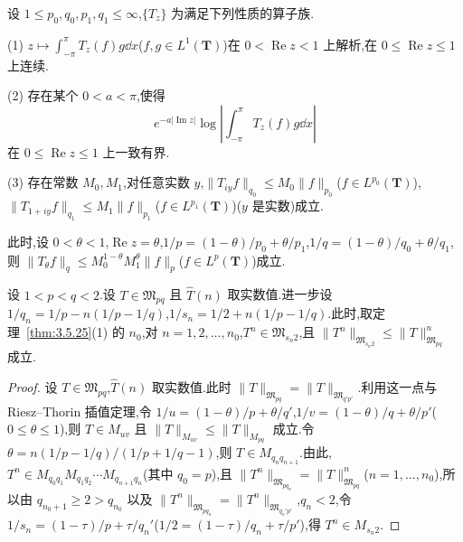 \begin{lemma}[Stein]\label{lem:3.5.28}
设 $1 \leq p_{0}, q_{0}, p_{1}, q_{1} \leq \infty$,$\{T_{z}\}$ 为满足下列性质的算子族.

(1) $z \mapsto \int_{-\pi}^{\pi}T_z(f)g\dd x$($f, g \in L^1(\mathbf{T})$)在 $0 < \operatorname{Re} z < 1$ 上解析,在 $0 \leq \operatorname{Re} z \leq 1$ 上连续.

(2) 存在某个 $0 < a < \pi$,使得
\begin{equation*}
e^{-a|\operatorname{Im}z|}\log\left|\int_{-\pi}^{\pi}T_{z}(f)g\dd x\right|
\end{equation*}
在 $0 \leq \operatorname{Re}z \leq 1$ 上一致有界.

(3) 存在常数 $M_0, M_1$,对任意实数 $y$,$\|T_{iy}f\|_{q_0} \leq M_0\|f\|_{p_0}$($f \in L^{p_0}(\mathbf{T})$),$\|T_{1+iy}f\|_{q_1} \leq M_1\|f\|_{p_1}$($f \in L^{p_1}(\mathbf{T})$)($y$ 是实数)成立.

此时,设 $0 < \theta < 1$,$\operatorname{Re}z = \theta$,$1/p = (1 - \theta)/p_0 + \theta/p_1$,$1/q = (1 - \theta)/q_0 + \theta/q_1$,则 $\|T_\theta f\|_q \leq M_0^{1-\theta}M_1^\theta\|f\|_p$($f \in L^p(\mathbf{T})$)成立.
\end{lemma}

\begin{lemma}\label{lem:3.5.29}
设 $1 < p < q < 2$.设 $T \in \mathfrak{M}_{pq}$ 且 $\widehat{T}(n)$ 取实数值.进一步设 $1/q_{n} = 1/p - n(1/p - 1/q)$,$1/s_{n} = 1/2 + n(1/p - 1/q)$.此时,取定理~\ref{thm:3.5.25}(1) 的 $n_{0}$,对 $n = 1, 2, \ldots, n_{0}$,$T^{n} \in \mathfrak{M}_{s_{n}2}$,且 $\|T^{n}\|_{\mathfrak{M}_{s_{n}2}} \leq \|T\|_{\mathfrak{M}_{pq}}^{n}$ 成立.
\end{lemma}

\begin{proof}
设 $T \in \mathfrak{M}_{pq}$,$\widehat{T}(n)$ 取实数值.此时 $\|T\|_{\mathfrak{M}_{pq}} = \|T\|_{\mathfrak{M}_{q'p'}}$.利用这一点与 Riesz--Thorin 插值定理,令 $1/u = (1-\theta)/p + \theta/q'$,$1/v = (1-\theta)/q + \theta/p'$($0 \leq \theta \leq 1$),则 $T \in M_{uv}$ 且 $\|T\|_{M_{uv}} \leq \|T\|_{M_{pq}}$ 成立.令 $\theta = n(1/p - 1/q)/(1/p + 1/q - 1)$,则 $T \in M_{q_n q_{n+1}}$.由此,$T^n \in M_{q_0 q_1} M_{q_1 q_2} \cdots M_{q_{n+1} q_n}$(其中 $q_0 = p$),且 $\|T^n\|_{\mathfrak{M}_{pq_n}} = \|T\|_{\mathfrak{M}_{pq}}^n$($n = 1, \ldots, n_0$),所以由 $q_{n_0 + 1} \geq 2 > q_{n_0}$ 以及 $\|T^n\|_{\mathfrak{M}_{pq_n}} = \|T^n\|_{\mathfrak{M}_{q_n'p'}}$,$q_n < 2$,令 $1/s_n = (1 - \tau)/p + \tau/q_n'$($1/2 = (1 - \tau)/q_n + \tau/p'$),得 $T^n \in M_{s_n2}$.
\end{proof}

